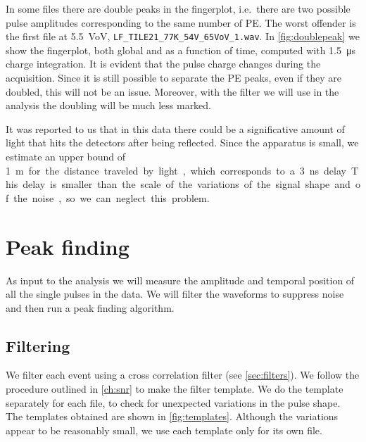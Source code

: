In some files there are double peaks in the fingerplot, i.e.~there are two
possible pulse amplitudes corresponding to the same number of PE. The worst
offender is the first file at \SI{5.5}{VoV},
\nolinkurl{LF_TILE21_77K_54V_65VoV_1.wav}. In \autoref{fig:doublepeak} we show
the fingerplot, both global and as a function of time, computed with
\SI{1.5}{\micro s} charge integration. It is evident that the pulse charge
changes during the acquisition. Since it is still possible to separate the PE
peaks, even if they are doubled, this will not be an issue. Moreover, with the
filter we will use in the analysis the doubling will be much less marked.

\begin{figure}
    
    
    
\end{figure}

It was reported to us that in this data there could be a significative amount
of light that hits the detectors after being reflected. Since the apparatus is
small, we estimate an upper bound of \SI{1}m for the distance traveled by
light, which corresponds to a \SI{3}{ns} delay. This delay is smaller than
the scale of the variations of the signal shape and of the noise, so we can
neglect this problem.

\section{Peak finding}

As input to the analysis we will measure the amplitude and temporal position of
all the single pulses in the data. We will filter the waveforms to suppress
noise and then run a peak finding algorithm.

\subsection{Filtering}
\label{sec:filtering}

We filter each event using a cross correlation filter (see
\autoref{sec:filters}). We follow the procedure outlined in \autoref{ch:snr} to
make the filter template. We do the template separately for each file, to check
for unexpected variations in the pulse shape. The templates obtained are shown
in \autoref{fig:templates}. Although the variations appear to be reasonably
small, we use each template only for its own file.

